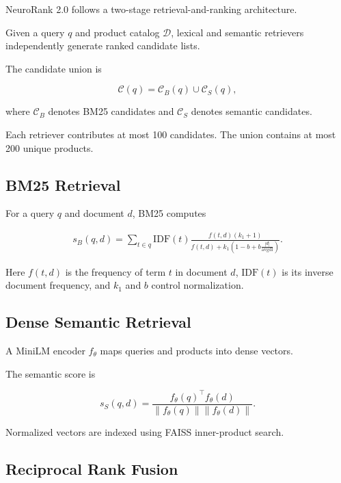 \documentclass[conference]{IEEEtran}
\begin{document}
NeuroRank 2.0 follows a two-stage
retrieval-and-ranking architecture.

Given a query $q$ and product catalog
$\mathcal{D}$, lexical and semantic
retrievers independently generate
ranked candidate lists.

The candidate union is

\begin{equation}
\mathcal{C}(q)=
\mathcal{C}_{B}(q)
\cup
\mathcal{C}_{S}(q),
\end{equation}

where $\mathcal{C}_{B}$ denotes BM25
candidates and $\mathcal{C}_{S}$
denotes semantic candidates.

Each retriever contributes at most
100 candidates. The union contains
at most 200 unique products.

\subsection{BM25 Retrieval}

For a query $q$ and document $d$,
BM25 computes

\begin{equation}
\begin{split}
s_B(q,d)=
\sum_{t\in q}
\mathrm{IDF}(t)
\frac{
f(t,d)(k_1+1)
}{
f(t,d)+
k_1\left(
1-b+
b\frac{|d|}{\mathrm{avgdl}}
\right)
}.
\end{split}
\end{equation}

Here $f(t,d)$ is the frequency
of term $t$ in document $d$,
$\mathrm{IDF}(t)$ is its inverse
document frequency, and $k_1$
and $b$ control normalization.

\subsection{Dense Semantic Retrieval}

A MiniLM encoder $f_{\theta}$
maps queries and products into
dense vectors.

The semantic score is

\begin{equation}
s_S(q,d)=
\frac{
f_{\theta}(q)^\top
f_{\theta}(d)
}{
\|f_{\theta}(q)\|
\|f_{\theta}(d)\|
}.
\end{equation}

Normalized vectors are indexed using
FAISS inner-product search.

\subsection{Reciprocal Rank Fusion}
\end{document}
